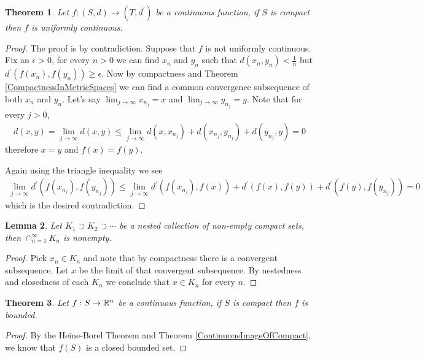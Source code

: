 \documentclass{amsart}
\newtheorem{thm}{Theorem}[section]
\newtheorem{lem}[thm]{Lemma}
\theoremstyle{remark}
\theoremstyle{definition}
\begin{document}
\begin{thm}\label{UniformContinuityOnCompactSets} Let $f : (S,d) \to (T, d^\prime)$ be a continuous function, if $S$ is
  compact then $f$ is uniformly continuous.
\end{thm}
\begin{proof}
The proof is by contradiction.  Suppose that $f$ is not uniformly
continuous.  Fix an $\epsilon > 0$, for every $n > 0$ we can find
$x_n$ and $y_n$ such that $d(x_n, y_n) < \frac{1}{n}$ but
$d^\prime(f(x_n), f(y_n)) \geq \epsilon$.  Now by compactness and Theorem
\ref{CompactnessInMetricSpaces} we can find a
common convergence subsequence of both $x_n$ and $y_n$.  Let's say
$\lim_{j \to \infty} x_{n_j} = x$ and $\lim_{j \to \infty} y_{n_j} =
y$.  Note that for every $j>0$, 
\begin{align*}
d(x,y) = \lim_{j \to \infty } d(x,y)\leq \lim_{j \to \infty } d(x,
x_{n_j}) + d(x_{n_j}, y_{n_j}) + d(y_{n_j}, y) = 0
\end{align*}
therefore $x=y$ and $f(x)=f(y)$.  

Again using the triangle inequality we see
\begin{align*}
\lim_{j \to \infty} d^\prime(f(x_{n_j}), f(y_{n_j})) \leq \lim_{j \to \infty}
d^\prime(f(x_{n_j}), f(x)) + d^\prime(f(x), f(y)) + d^\prime(f(y), f(y_{n_j})) = 0
\end{align*}
which is the desired contradiction.
\end{proof}

\begin{lem}\label{IntersectionOfNestedCompactSets}Let $K_1 \supset K_2
  \supset \cdots$ be a nested collection of non-empty compact sets,
  then $\cap_{n=1}^\infty K_n$ is nonempty.
\end{lem}
\begin{proof}Pick $x_n \in K_n$ and note that by compactness there is
  a convergent subsequence.  Let $x$ be the limit of that convergent
  subsequence.  By nestedness and closedness of each $K_n$ we conclude
  that $x \in K_n$ for every $n$.
\end{proof}

\begin{thm}Let $f : S \to \mathbb{R}^n$ be a continuous function, if $S$ is
  compact then $f$ is bounded.
\end{thm}
\begin{proof}
By the Heine-Borel Theorem and Theorem \ref{ContinuousImageOfCompact}, we know that $f(S)$ is a closed bounded set.
\end{proof}
\end{document}
